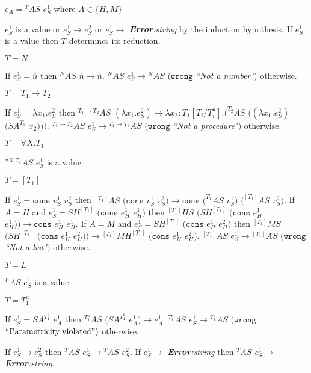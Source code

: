 \begin{case}
\label{as}
$e_{A}={^{T}A}S$ $e_{S}^{1}$ where $A\in\lbrace H,M\rbrace$

$e_{S}^{1}$ is a value or $e_{S}^{1}\rightarrow e_{S}^{2}$ or $e_{S}^{1}\rightarrow$ \emph{\textbf{Error}:\;string} by the induction hypothesis.  If $e_{S}^{1}$ is a value then $T$ determines its reduction.
\begin{subcase}
$T=N$

If $e_{S}^{1}=\overline{n}$ then $^{N}AS$ $\overline{n}\rightarrow\overline{n}$.  $^{N}AS$ $e_{S}^{1}\rightarrow{^{N}A}S$ $(\mathtt{wrong}$ \emph{``Not a number"}$)$ otherwise.
\end{subcase}
\begin{subcase}
$T=T_{1}\rightarrow T_{2}$

If $e_{S}^{1}=\lambda x_{1}.e_{S}^{2}$ then $^{T_{1}\rightarrow T_{2}}AS$ $(\lambda x_{1}.e_{S}^{2})\rightarrow\lambda x_{2}:T_{1}[T_{i}/T^{a}_{i}].(^{T_{2}}AS$ $((\lambda x_{1}.e_{S}^{2})$ $(SA^{T_{1}}$ $x_{2})))$.  $^{T_{1}\rightarrow T_{2}}AS$ $e_{S}^{1}\rightarrow{^{T_{1}\rightarrow T_{2}}A}S$ $(\mathtt{wrong}$ \emph{``Not a procedure"}$)$ otherwise.
\end{subcase}
\begin{subcase}
$T=\forall X.T_{1}$

$^{\forall X.T_{1}}AS$ $e_{S}^{1}$ is a value.
\end{subcase}
\begin{subcase}
$T=[T_{1}]$

If $e_{S}^{1}=\mathtt{cons}$ $v_{S}^{1}$ $v_{S}^{2}$ then $^{[T_{1}]}AS$ $(\mathtt{cons}$ $v_{S}^{1}$ $v_{S}^{2})\rightarrow\mathtt{cons}$ $(^{T_{1}}AS$ $v_{S}^{1})$ $(^{[T_{1}]}AS$ $v_{S}^{2})$.  If $A=H$ and $e_{S}^{1}=SH^{[T_{1}]}$ $(\mathtt{cons}$ $e_{H}^{1}$ $e_{H}^{1})$ then $^{[T_{1}]}HS$ $(SH^{[T_{1}]}$ $(\mathtt{cons}$ $e_{H}^{1}$ $e_{H}^{1}))\rightarrow\mathtt{cons}$ $e_{H}^{1}$ $e_{H}^{1}$.  If $A=M$ and $e_{S}^{1}=SH^{[T_{1}]}$ $(\mathtt{cons}$ $e_{H}^{1}$ $e_{H}^{2})$ then $^{[T_{1}]}MS$ $(SH^{[T_{1}]}$ $(\mathtt{cons}$ $e_{H}^{1}$ $e_{H}^{2}))\rightarrow{^{[T_{1}]}M}H^{[T_{1}]}$ $(\mathtt{cons}$ $e_{H}^{1}$ $e_{H}^{2})$.  $^{[T_{1}]}AS$ $e_{S}^{1}\rightarrow{^{[T_{1}]}A}S$ $(\mathtt{wrong}$ \emph{``Not a list"}$)$ otherwise.
\end{subcase}
\begin{subcase}
$T=L$

$^{L}AS$ $e_{S}^{1}$ is a value.
\end{subcase}
\begin{subcase}
$T=T_{1}^{a}$

If $e_{S}^{1}=SA^{T_{1}^{a}}$ $e_{A}^{1}$ then $^{T_{1}^{a}}AS$ $(SA^{T_{1}^{a}}$ $e_{A}^{1})\rightarrow e_{A}^{1}$.  $^{T_{1}^{a}}AS$ $e_{S}^{1}\rightarrow{^{T_{1}^{a}}A}S$ $(\mathtt{wrong}$ $\mathrm{``Parametricity\;violated"})$ otherwise.
\end{subcase}
If $e_{S}^{1}\rightarrow e_{S}^{2}$ then $^{T}AS$ $e_{S}^{1}\rightarrow{^{T}A}S$ $e_{S}^{2}$.  If $e_{S}^{1}\rightarrow$ \emph{\textbf{Error}:\;string} then $^{T}AS$ $e_{S}^{1}\rightarrow$ \emph{\textbf{Error}:\;string}.
\end{case}